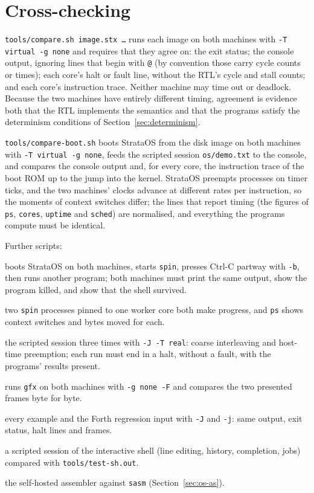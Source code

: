 \section{Cross-checking}\label{sec:compare}

\texttt{tools/compare.sh image.stx \ldots} runs each image on both machines with \texttt{-T virtual -g
none} and requires that they agree on: the exit status; the console output, ignoring lines that begin
with \texttt{@} (by convention those carry cycle counts or times); each core's halt or fault line,
without the RTL's cycle and stall counts; and each core's instruction trace. Neither machine may time
out or deadlock. Because the two machines have entirely different timing, agreement is evidence both
that the RTL implements the semantics and that the programs satisfy the determinism conditions of
Section~\ref{sec:determinism}.

\texttt{tools/compare-boot.sh} boots StrataOS from the disk image on both machines with \texttt{-T
virtual -g none}, feeds the scripted session \texttt{os/demo.txt} to the console, and compares the
console output and, for every core, the instruction trace of the boot ROM up to the jump into the
kernel. StrataOS preempts processes on timer ticks, and the two machines' clocks advance at different
rates per instruction, so the moments of context switches differ; the lines that report timing (the
figures of \texttt{ps}, \texttt{cores}, \texttt{uptime} and \texttt{sched}) are normalised, and
everything the programs compute must be identical.

Further scripts:
\begin{description}[leftmargin=1em,style=nextline]
\item[\texttt{tools/test-break.sh}] boots StrataOS on both machines, starts \texttt{spin}, presses
  Ctrl-C partway with \texttt{-b}, then runs another program; both machines must print the same output,
  show the program killed, and show that the shell survived.
\item[\texttt{tools/test-preempt.sh}] two \texttt{spin} processes pinned to one worker core both make
  progress, and \texttt{ps} shows context switches and bytes moved for each.
\item[\texttt{tools/test-boot-jit.sh}] the scripted session three times with \texttt{-J -T real}: coarse
  interleaving and host-time preemption; each run must end in a halt, without a fault, with the
  programs' results present.
\item[\texttt{tools/test-fb.sh}] runs \texttt{gfx} on both machines with \texttt{-g none -F} and
  compares the two presented frames byte for byte.
\item[\texttt{tools/test-jit.sh}] every example and the Forth regression input with \texttt{-J} and
  \texttt{-j}: same output, exit status, halt lines and frames.
\item[\texttt{tools/test-sh.sh}] a scripted session of the interactive shell (line editing, history,
  completion, jobs) compared with \texttt{tools/test-sh.out}.
\item[\texttt{tools/test-as.sh}] the self-hosted assembler against \texttt{sasm}
  (Section~\ref{sec:os-as}).
\end{description}

